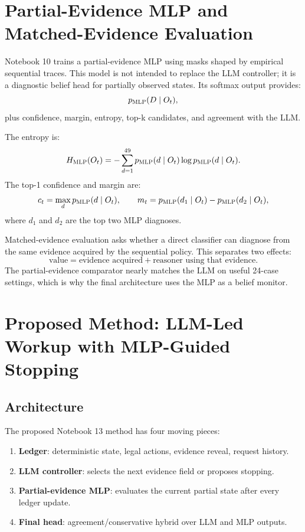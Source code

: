 \documentclass[11pt]{article}
\newcommand{\mlp}{\textsc{MLP}}
\newcommand{\llm}{\textsc{LLM}}
\begin{document}
\section{Partial-Evidence MLP and Matched-Evidence Evaluation}

Notebook 10 trains a partial-evidence \mlp{} using masks shaped by empirical sequential traces. This model is not intended to replace the \llm{} controller; it is a diagnostic belief head for partially observed states. Its softmax output provides:
\[
p_{\mlp}(D \mid O_t),
\]
plus confidence, margin, entropy, top-k candidates, and agreement with the \llm{}.

The entropy is:
\[
H_{\mlp}(O_t) = -\sum_{d=1}^{49} p_{\mlp}(d\mid O_t)\log p_{\mlp}(d\mid O_t).
\]
The top-1 confidence and margin are:
\[
c_t = \max_d p_{\mlp}(d\mid O_t), \qquad
m_t = p_{\mlp}(d_1\mid O_t) - p_{\mlp}(d_2\mid O_t),
\]
where $d_1$ and $d_2$ are the top two \mlp{} diagnoses.

Matched-evidence evaluation asks whether a direct classifier can diagnose from the same evidence acquired by the sequential policy. This separates two effects:
\[
\text{value} = \text{evidence acquired} + \text{reasoner using that evidence}.
\]
The partial-evidence comparator nearly matches the \llm{} on useful 24-case settings, which is why the final architecture uses the \mlp{} as a belief monitor.

\section{Proposed Method: LLM-Led Workup with MLP-Guided Stopping}

\subsection{Architecture}

The proposed Notebook 13 method has four moving pieces:
\begin{enumerate}[leftmargin=*]
    \item \textbf{Ledger}: deterministic state, legal actions, evidence reveal, request history.
    \item \textbf{LLM controller}: selects the next evidence field or proposes stopping.
    \item \textbf{Partial-evidence MLP}: evaluates the current partial state after every ledger update.
    \item \textbf{Final head}: agreement/conservative hybrid over \llm{} and \mlp{} outputs.
\end{enumerate}
\end{document}
